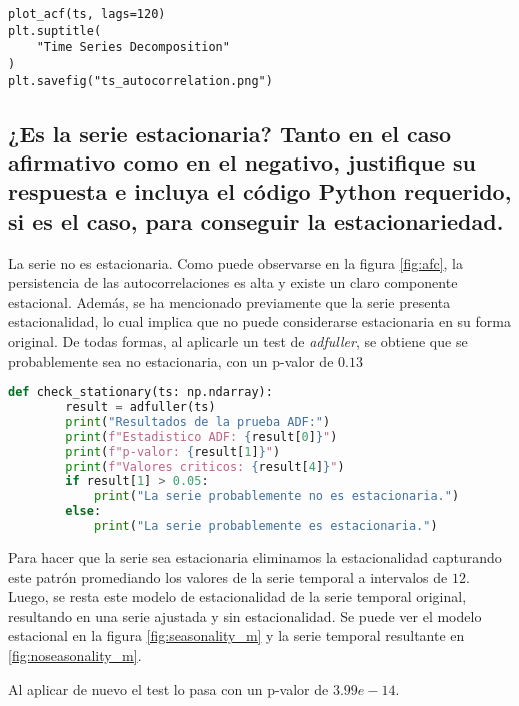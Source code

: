 \documentclass[12pt,letterpaper]{article}
\begin{document}
\begin{lstlisting}
plot_acf(ts, lags=120)
plt.suptitle(
    "Time Series Decomposition"
)  
plt.savefig("ts_autocorrelation.png")
\end{lstlisting}

\subsection{¿Es la serie estacionaria? Tanto en el caso afirmativo como en el negativo,
    justifique su respuesta e incluya el código Python requerido, si es el caso, para
    conseguir la estacionariedad.}

La serie no es estacionaria. Como puede observarse en la figura \ref{fig:afc}, la persistencia de las autocorrelaciones es alta y existe un claro componente estacional. Además, se ha mencionado previamente que la serie presenta estacionalidad, lo cual implica que no puede considerarse estacionaria en su forma original. De todas formas, al aplicarle un test de \textit{adfuller}, se obtiene que se probablemente sea no estacionaria, con un p-valor de $0.13$
\begin{lstlisting}[language=Python]
    def check_stationary(ts: np.ndarray):
        result = adfuller(ts)
        print("Resultados de la prueba ADF:")
        print(f"Estadistico ADF: {result[0]}")
        print(f"p-valor: {result[1]}")
        print(f"Valores criticos: {result[4]}")
        if result[1] > 0.05:
            print("La serie probablemente no es estacionaria.")
        else:
            print("La serie probablemente es estacionaria.")
\end{lstlisting}


Para hacer que la serie sea estacionaria eliminamos la estacionalidad capturando este patrón promediando los valores de la serie temporal a intervalos de $12$. Luego, se resta este modelo de estacionalidad de la serie temporal original, resultando en una serie ajustada y sin estacionalidad. Se puede ver el modelo estacional en la figura \ref{fig:seasonality_m} y la serie temporal resultante en \ref{fig:noseasonality_m}. 

Al aplicar de nuevo el test lo pasa con un p-valor de $3.99e-14$.
\end{document}
